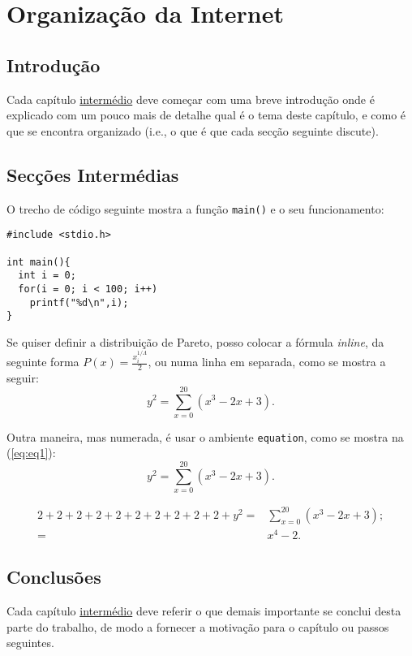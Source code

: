 \chapter{Organização da Internet}
\label{chap:organização-da-internet}

\section{Introdução}
\label{chap4:sec:intro}
Cada capítulo \underline{intermédio} deve começar com uma breve introdução onde é explicado com um pouco mais de detalhe qual é o tema deste capítulo, e como é que se encontra organizado (i.e., o que é que cada secção seguinte discute).

\section{Secções Intermédias}
\label{chap4:sec:...}

O trecho de código seguinte mostra a função \texttt{main()} e o seu funcionamento:
\begin{lstlisting}[caption=Trecho de código usado no projeto.]
#include <stdio.h>

int main(){
  int i = 0;
  for(i = 0; i < 100; i++)
    printf("%d\n",i);
}
\end{lstlisting}


Se quiser definir a distribuição de Pareto, posso colocar a fórmula \emph{inline}, da seguinte forma $P(x)=\frac{x^{1/\Lambda}_{i}}{2}$, ou numa linha em separada, como se mostra a seguir:
$$ y^2 = \sum_{x=0}^{20}( x^3 - 2x + 3).$$

Outra maneira, mas numerada, é usar o ambiente \texttt{equation}, como se mostra na (\ref{eq:eq1}):
\begin{equation}
 y^2 = \sum_{x=0}^{20}( x^3 - 2x + 3).
 \label{eq:eq1}
\end{equation}

\begin{align}
 2+2+2+2+2+2+2+2+2+2+y^2 = & \sum_{x=0}^{20}( x^3 - 2x + 3);\\
                         = & x^4 -2.
 \label{eq:eq2}
\end{align}


\section{Conclusões}
\label{chap4:sec:concs}
Cada capítulo \underline{intermédio} deve referir o que demais importante se conclui desta parte do trabalho, de modo a fornecer a motivação para o capítulo ou passos seguintes.